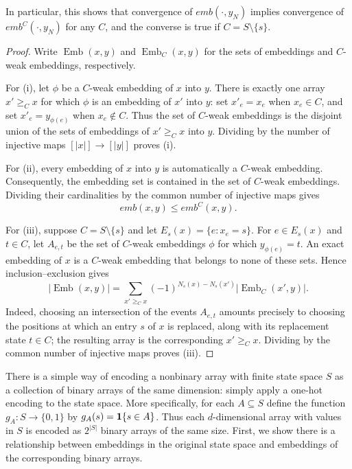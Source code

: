 \begin{subappendices}
\begin{lemma}
    In particular, this shows that convergence of $emb(\cdot, y_N)$ implies convergence of $emb^C(\cdot, y_N)$ for any $C$, and the converse is true if $C = S \setminus \{s\}$.

\end{lemma}

\begin{proof}
Write $\operatorname{Emb}(x,y)$ and $\operatorname{Emb}_C(x,y)$ for the
sets of embeddings and $C$-weak embeddings, respectively.

For (i), let $\phi$ be a $C$-weak embedding of $x$ into $y$. There is
exactly one array $x' \geq_C x$ for which $\phi$ is an embedding of $x'$
into $y$: set $x'_e=x_e$ when $x_e\in C$, and set
$x'_e=y_{\phi(e)}$ when $x_e\notin C$. Thus the set of $C$-weak
embeddings is the disjoint union of the sets of embeddings of
$x' \geq_C x$ into $y$. Dividing by the number of injective maps
$[|x|]\to[|y|]$ proves (i).

For (ii), every embedding of $x$ into $y$ is automatically a $C$-weak
embedding. Consequently, the embedding set is contained in the set of
$C$-weak embeddings. Dividing their cardinalities by the common number of
injective maps gives
\[
    emb(x,y) \leq emb^C(x,y).
\]

For (iii), suppose $C=S\setminus\{s\}$ and let
$E_s(x)=\{e:x_e=s\}$. For $e\in E_s(x)$ and $t\in C$, let $A_{e,t}$ be
the set of $C$-weak embeddings $\phi$ for which $y_{\phi(e)}=t$. An exact
embedding of $x$ is a $C$-weak embedding that belongs to none of these
sets. Hence inclusion--exclusion gives
\[
    |\operatorname{Emb}(x,y)|
    = \sum_{x'\geq_C x}
      (-1)^{N_s(x)-N_s(x')}
      |\operatorname{Emb}_C(x',y)|.
\]
Indeed, choosing an intersection of the events $A_{e,t}$ amounts precisely
to choosing the positions at which an entry $s$ of $x$ is replaced, along
with its replacement state $t\in C$; the resulting array is the
corresponding $x'\geq_C x$. Dividing by the common number of injective maps
proves (iii).
\end{proof}


\noindent There is a simple way of encoding a nonbinary array with finite
state space $S$ as a collection of binary arrays of the same dimension:
simply apply a one-hot encoding to the state space. More specifically,
for each $A \subseteq S$ define the function $g_A: S \to \{0,1\}$ by
$g_A(s) = \mathbf{1} \{s \in A\}$. Thus each $d$-dimensional array with values
in $S$ is encoded as $2^{|S|}$ binary arrays of the same size. First,
we show there is a relationship between embeddings in the original
state space and embeddings of the corresponding binary arrays.


\end{subappendices}
